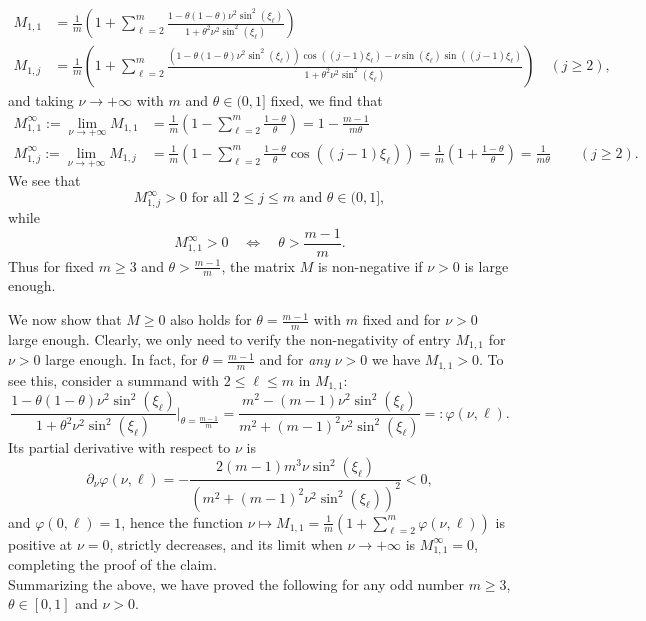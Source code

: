 \documentclass[a4paper]{article}
\newcommand{\te}{\theta}
\begin{document}
\begin{description}[style=unboxed,leftmargin=0cm]
\begin{align*}
	M_{1,1} & = \frac{1}{m} \left(1 + \sum_{\ell=2}^{m} \frac{1-\theta(1-\theta)\nu^2\sin^2(\xi_\ell)}
		{1+\theta^2\nu^2\sin^2(\xi_\ell)}\right) \\
	M_{1,j} & = \frac{1}{m} \left(1 + \sum_{\ell=2}^{m} \frac{(1-\theta(1-\theta)\nu^2\sin^2(\xi_\ell))
		\cos((j-1)\xi_\ell) - \nu \sin(\xi_\ell)\sin((j-1)\xi_\ell)}{1+\theta^2\nu^2 \sin^2(\xi_\ell)}
		\right) \quad (j\ge 2),
\end{align*}
and taking $\nu \to +\infty$ with $m$ and $\te\in(0,1]$ fixed, we find that
\begin{align*} 
    M_{1,1}^\infty := \lim_{\nu \to +\infty} M_{1,1} & = \frac{1}{m} \left(1 - \sum_{\ell=2}^m \frac{1-\theta}{\theta}\right) =  1-\frac{m-1}{m\theta}\\
    M_{1,j}^\infty := \lim_{\nu \to +\infty} M_{1,j} & = \frac{1}{m} \left(1 - \sum_{\ell=2}^m \frac{1-\theta}{\theta}\cos((j-1)\xi_\ell)\right) = \frac{1}{m} \left(1+\frac{1-\theta}{\theta}\right) = \frac{1}{m\theta} \quad\quad (j\ge 2).
\end{align*}
We see that
\[M_{1,j}^\infty>0 \text{ for all } 2\le j\le m \text{ and } \te\in(0,1],
\]
 while 
\[M_{1,1}^\infty>0 \quad\Longleftrightarrow\quad \theta>\frac{m-1}{m}.
\]
Thus for fixed $m\ge 3$ and $\theta>\frac{m-1}{m}$, the matrix $M$ is non-negative 
if $\nu>0$ is large enough.

We now show that $M\ge 0$ also holds for $\theta=\frac{m-1}{m}$ with $m$ fixed and for $\nu>0$ large enough. 
Clearly, we only need to verify the non-negativity of entry $M_{1,1}$ for $\nu>0$ large enough. 
In fact, for $\theta=\frac{m-1}{m}$ and for \emph{any} $\nu>0$ we have $M_{1,1}> 0$. To see this, consider a summand with $2\le\ell\le m$ in $M_{1,1}$: 
\[
 \frac{1-\theta(1-\theta)\nu^2\sin^2(\xi_\ell)}{1+\theta^2\nu^2\sin^2(\xi_\ell)}\Big|_{\theta=\frac{m-1}{m}}=
 \frac{m^2-(m-1) \nu ^2 \sin ^2\left(\xi _\ell\right)}{m^2+(m-1)^2 \nu ^2 \sin ^2\left(\xi _\ell\right)}=:\varphi(\nu,\ell).
\]
Its partial derivative with respect to $\nu$ is
\[
\partial_\nu\varphi(\nu,\ell)=-\frac{2 (m-1) m^3 \nu  \sin ^2\left(\xi _\ell\right)}{\left(m^2+(m-1)^2 \nu ^2 \sin ^2\left(\xi _\ell\right)\right)^2}<0,
\]
and $\varphi(0,\ell)=1$, hence the function $\nu\mapsto M_{1,1}=\frac{1}{m} \left(1 + \sum_{\ell=2}^{m} \varphi(\nu,\ell)\right)$ is positive at $\nu=0$, strictly decreases, and its limit when $\nu\to +\infty$ is $M_{1,1}^\infty=0$, completing the proof of the claim.\\

Summarizing the above, we have proved the following for any odd number $m\ge 3$, $\te\in[0,1]$ and
$\nu>0$.
\end{description}
\end{document}
